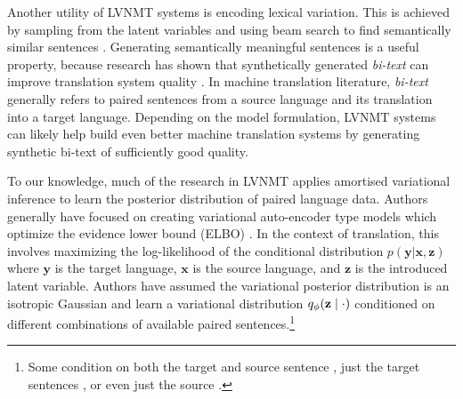 Another utility of \ac{LVNMT} systems is encoding lexical variation. This is achieved by sampling from the latent variables and using beam search to find semantically similar sentences \cite{schulz2018StochasticDecoder, shen2019diverse}. Generating semantically meaningful sentences is a useful property, because research has shown that synthetically generated \textit{bi-text} can improve translation system quality \cite{sennrich2015ImprovingNMT, edunov2018understandigBackTrans}. In machine translation literature, \textit{bi-text} generally refers to paired sentences from a source language and its translation into a target language. Depending on the model formulation, \ac{LVNMT} systems can likely help build even better machine translation systems by generating synthetic bi-text of sufficiently good quality. 


To our knowledge, much of the research in \ac{LVNMT} applies amortised variational inference to learn the posterior distribution of paired language data. Authors generally have focused on creating variational auto-encoder type models which optimize the evidence lower bound (ELBO) \cite{ kingma2014autoencodingVB, rezende2014stochasticBackprop}. In the context of translation, this involves maximizing the log-likelihood of the conditional distribution $p(\textbf{y} | \textbf{x}, \textbf{z})$ where $\textbf{y}$ is the target language, $\textbf{x}$ is the source language, and $\textbf{z}$ is the introduced latent variable. Authors have assumed the variational posterior distribution is an isotropic Gaussian and learn a variational distribution $q_{\phi}(\textbf{z}\; | \;{\cdot})$ conditioned on different combinations of available paired sentences.\footnote{ Some condition on both the target and source sentence \cite{Zhang2016VNMT,eikema2018AEVNMT,harshil2018GNMT},  just the target sentences \cite{schulz2018StochasticDecoder}, or even just the source \cite{eikema2018AEVNMT}.} 

